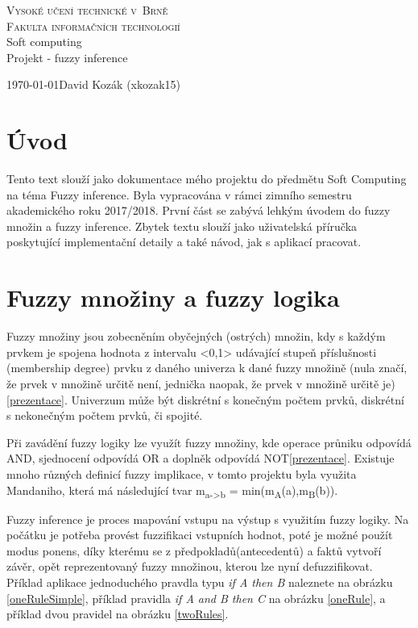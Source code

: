 \documentclass[12pt,a4paper,titlepage]{article}
\begin{document}
\begin{titlepage}
\begin{center}
    {
    	\Huge\textsc{Vysoké učení technické v~Brně}}\\
    \smallskip
    {
    	\huge\textsc{Fakulta informačních technologií}}\\
    \bigskip
    \huge{Soft computing}\\
    \smallskip
    \Huge{Projekt - fuzzy inference}\\
\end{center}
    {\Large \today \hfill David Kozák (xkozak15)  }\\
\end{titlepage}

\newpage

\section{Úvod}
Tento text slouží jako dokumentace mého projektu do předmětu Soft Computing na téma Fuzzy inference. Byla vypracována v rámci zimního semestru akademického roku 2017/2018. První část se zabývá lehkým úvodem do fuzzy množin a fuzzy inference. Zbytek textu slouží jako uživatelská příručka poskytující implementační detaily a také návod, jak s aplikací pracovat.

\section{Fuzzy množiny a fuzzy logika}
Fuzzy množiny jsou zobecněním obyčejných (ostrých) množin, kdy s každým prvkem je spojena hodnota z intervalu <0,1> udávající stupeň příslušnosti (membership degree) prvku z daného univerza
k dané fuzzy množině (nula značí, že prvek v množině určitě není, jednička naopak, že prvek v množině určitě je)\ref{prezentace}. Univerzum může být diskrétní s konečným počtem prvků, diskrétní s nekonečným počtem prvků, či spojité.

Při zavádění fuzzy logiky lze využít fuzzy množiny, kde operace průniku odpovídá AND, sjednocení odpovídá OR a doplněk odpovídá NOT\ref{prezentace}. Existuje mnoho různých definicí fuzzy implikace, v tomto projektu byla využita Mandaniho, která má následující tvar m\textsubscript{a->b} = min(m\textsubscript{A}(a),m\textsubscript{B}(b)).

Fuzzy inference je proces mapování vstupu na výstup s využitím fuzzy logiky. Na počátku je potřeba provést fuzzifikaci vstupních hodnot, poté je možné použít modus ponens, díky kterému se z předpokladů(antecedentů) a faktů vytvoří závěr, opět reprezentovaný fuzzy množinou, kterou lze nyní defuzzifikovat.  Příklad aplikace jednoduchého pravdla typu \textit{if A then B} naleznete na obrázku \ref{oneRuleSimple}, příklad pravidla \textit{if A and B then C} na obrázku \ref{oneRule}, a příklad dvou pravidel na obrázku \ref{twoRules}.
\end{document}

